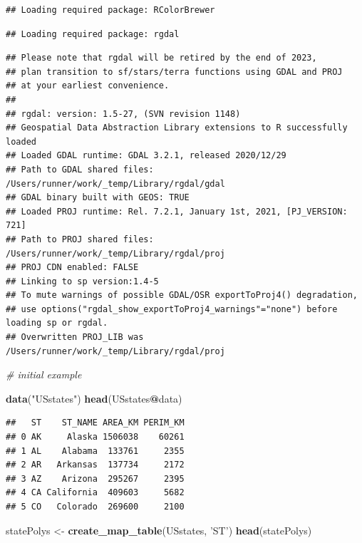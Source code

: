 \documentclass[
]{krantz}
\makeatletter
\newenvironment{Shaded}{\begin{snugshade}}{\end{snugshade}}
\newcommand{\CommentTok}[1]{\textcolor[rgb]{0.37,0.37,0.37}{\textit{#1}}}
\newcommand{\KeywordTok}[1]{\textcolor[rgb]{0.27,0.27,0.27}{\textbf{#1}}}
\newcommand{\NormalTok}[1]{#1}
\newcommand{\OperatorTok}[1]{\textcolor[rgb]{0.43,0.43,0.43}{\textbf{#1}}}
\newcommand{\StringTok}[1]{\textcolor[rgb]{0.5,0.5,0.5}{#1}}
\newenvironment{kframe}{%
\medskip{}
\setlength{\fboxsep}{.8em}
 \def\at@end@of@kframe{}%
 \ifinner\ifhmode%
  \def\at@end@of@kframe{\end{minipage}}%
  \begin{minipage}{\columnwidth}%
 \fi\fi%
 \def\FrameCommand##1{\hskip\@totalleftmargin \hskip-\fboxsep
 \colorbox{shadecolor}{##1}\hskip-\fboxsep
     \hskip-\linewidth \hskip-\@totalleftmargin \hskip\columnwidth}%
 \MakeFramed {\advance\hsize-\width
   \@totalleftmargin\z@ \linewidth\hsize
   \@setminipage}}%
 {\par\unskip\endMakeFramed%
 \at@end@of@kframe}
\renewenvironment{Shaded}{\begin{kframe}}{\end{kframe}}
\makeatother
\begin{document}
\begin{verbatim}
## Loading required package: RColorBrewer
\end{verbatim}

\begin{verbatim}
## Loading required package: rgdal
\end{verbatim}

\begin{verbatim}
## Please note that rgdal will be retired by the end of 2023,
## plan transition to sf/stars/terra functions using GDAL and PROJ
## at your earliest convenience.
## 
## rgdal: version: 1.5-27, (SVN revision 1148)
## Geospatial Data Abstraction Library extensions to R successfully loaded
## Loaded GDAL runtime: GDAL 3.2.1, released 2020/12/29
## Path to GDAL shared files: /Users/runner/work/_temp/Library/rgdal/gdal
## GDAL binary built with GEOS: TRUE 
## Loaded PROJ runtime: Rel. 7.2.1, January 1st, 2021, [PJ_VERSION: 721]
## Path to PROJ shared files: /Users/runner/work/_temp/Library/rgdal/proj
## PROJ CDN enabled: FALSE
## Linking to sp version:1.4-5
## To mute warnings of possible GDAL/OSR exportToProj4() degradation,
## use options("rgdal_show_exportToProj4_warnings"="none") before loading sp or rgdal.
## Overwritten PROJ_LIB was /Users/runner/work/_temp/Library/rgdal/proj
\end{verbatim}

\begin{Shaded}
\begin{Highlighting}[]
\CommentTok{# initial example}

\KeywordTok{data}\NormalTok{(}\StringTok{"USstates"}\NormalTok{)}
\KeywordTok{head}\NormalTok{(USstates}\OperatorTok{@}\NormalTok{data)}
\end{Highlighting}
\end{Shaded}

\begin{verbatim}
##   ST    ST_NAME AREA_KM PERIM_KM
## 0 AK     Alaska 1506038    60261
## 1 AL    Alabama  133761     2355
## 2 AR   Arkansas  137734     2172
## 3 AZ    Arizona  295267     2395
## 4 CA California  409603     5682
## 5 CO   Colorado  269600     2100
\end{verbatim}

\begin{Shaded}
\begin{Highlighting}[]
\NormalTok{statePolys <-}\StringTok{ }\KeywordTok{create_map_table}\NormalTok{(USstates, }\StringTok{'ST'}\NormalTok{)}
\KeywordTok{head}\NormalTok{(statePolys)}
\end{Highlighting}
\end{Shaded}
\end{document}
